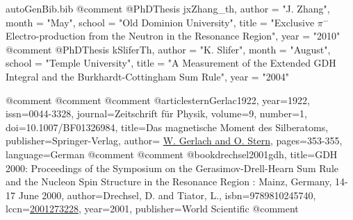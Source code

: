 \begin{filecontents*}{autoGenBib.bib}
@comment %
@PhDThesis{ jxZhang_th,
	author = "J. Zhang",
	month = "May",
	school = "Old Dominion University",
	title = "{Exclusive $\pi^-$ Electro-production from the Neutron in the Resonance Region}",
	year = "2010"
}
@comment %
@PhDThesis{ kSliferTh,
	author = "K. Slifer",
	month = "August",
	school = "Temple University",
	title = "{A Measurement of the Extended GDH Integral and the Burkhardt-Cottingham Sum Rule}",
	year = "2004"
}

@comment %
@comment %
@comment %
@article{sternGerlac1922,
year={1922},
issn={0044-3328},
journal={Zeitschrift für Physik},
volume={9},
number={1},
doi={10.1007/BF01326984},
title={Das magnetische Moment des Silberatoms},
publisher={Springer-Verlag},
author={ \href{http://dx.doi.org/10.1007/BF01326984}{W. Gerlach  and O. Stern}},
pages={353-355},
language={German}
}
@comment %
@comment %
@book{drechsel2001gdh,
  title={GDH 2000: Proceedings of the Symposium on the Gerasimov-Drell-Hearn Sum Rule and the Nucleon Spin Structure in the Resonance Region : Mainz, Germany, 14-17 June 2000},
  author={Drechsel, D. and Tiator, L.},
  isbn={9789810245740},
  lccn={\href{http://books.google.com/books?id=-\_2Wg8lHIucC}{2001273228}},
  year={2001},
  publisher={World Scientific}
}      
@comment %

\end{filecontents*}
